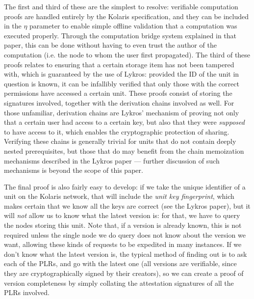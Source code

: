 \documentclass{extreport}
\begin{document}
The first and third of these are the simplest to resolve: verifiable computation proofs are handled entirely by the Kolaris specification, and they can be included in the \(\eta\) parameter to enable simple offline validation that a computation was executed properly. Through the computation bridge system explained in that paper, this can be done without having to even trust the author of the computation (i.e. the node to whom the user first propagated). The third of these proofs relates to ensuring that a certain storage item has not been tampered with, which is guaranteed by the use of Lykros: provided the ID of the unit in question is known, it can be infallibly verified that only those with the correct permissions have accessed a certain unit. These proofs consist of storing the signatures involved, together with the derivation chains involved as well. For those unfamiliar, derivation chains are Lykros' mechanism of proving not only that a certain user had access to a certain key, but also that they were \emph{supposed} to have access to it, which enables the cryptographic protection of sharing. Verifying these chains is generally trivial for units that do not contain deeply nested prerequisites, but those that do may benefit from the chain memoization mechanisms described in the Lykros paper --- further discussion of such mechanisms is beyond the scope of this paper.

The final proof is also fairly easy to develop: if we take the unique identifier of a unit on the Kolaris network, that will include the \emph{unit key fingerprint}, which makes certain that we know all the keys are correct (see the Lykros paper), but it will \emph{not} allow us to know what the latest version is: for that, we have to query the nodes storing this unit. Note that, if a version is already known, this is not required unless the single node we do query does not know about the version we want, allowing these kinds of requests to be expedited in many instances. If we don't know what the latest version is, the typical method of finding out is to ask each of the PLRs, and go with the latest one (all versions are verifiable, since they are cryptographically signed by their creators), so we can create a proof of version completeness by simply collating the attestation signatures of all the PLRs involved.
\end{document}

